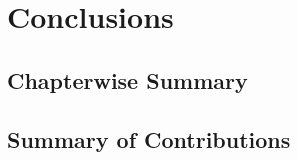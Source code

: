 \chapter{Conclusions}
\label{ch:conclusions}

\section{Chapterwise Summary}

\section{Summary of Contributions}
